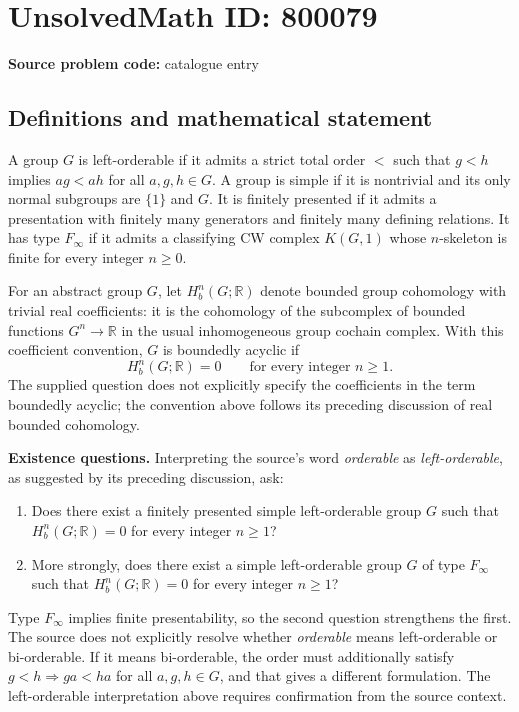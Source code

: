 \documentclass[11pt]{article}
\newcommand{\R}{\mathbb{R}}
\begin{document}
\section*{UnsolvedMath ID: 800079}
\textbf{Source problem code:} catalogue entry
\subsection{Definitions and mathematical statement}
A group \(G\) is left-orderable if it admits a strict total order \(<\) such that \(g<h\) implies \(ag<ah\) for all \(a,g,h\in G\). A group is simple if it is nontrivial and its only normal subgroups are \(\{1\}\) and \(G\). It is finitely presented if it admits a presentation with finitely many generators and finitely many defining relations. It has type \(F_\infty\) if it admits a classifying CW complex \(K(G,1)\) whose \(n\)-skeleton is finite for every integer \(n\geq 0\).

For an abstract group \(G\), let \(H_b^n(G;\R)\) denote bounded group cohomology with trivial real coefficients: it is the cohomology of the subcomplex of bounded functions \(G^n\to\R\) in the usual inhomogeneous group cochain complex. With this coefficient convention, \(G\) is boundedly acyclic if
\[
H_b^n(G;\R)=0\qquad\text{for every integer }n\geq 1.
\]
The supplied question does not explicitly specify the coefficients in the term boundedly acyclic; the convention above follows its preceding discussion of real bounded cohomology.

\textbf{Existence questions.} Interpreting the source's word \emph{orderable} as \emph{left-orderable}, as suggested by its preceding discussion, ask:
\begin{enumerate}
\item Does there exist a finitely presented simple left-orderable group \(G\) such that \(H_b^n(G;\R)=0\) for every integer \(n\geq 1\)?
\item More strongly, does there exist a simple left-orderable group \(G\) of type \(F_\infty\) such that \(H_b^n(G;\R)=0\) for every integer \(n\geq 1\)?
\end{enumerate}
Type \(F_\infty\) implies finite presentability, so the second question strengthens the first. The source does not explicitly resolve whether \emph{orderable} means left-orderable or bi-orderable. If it means bi-orderable, the order must additionally satisfy \(g<h\Rightarrow ga<ha\) for all \(a,g,h\in G\), and that gives a different formulation. The left-orderable interpretation above requires confirmation from the source context.
\end{document}
